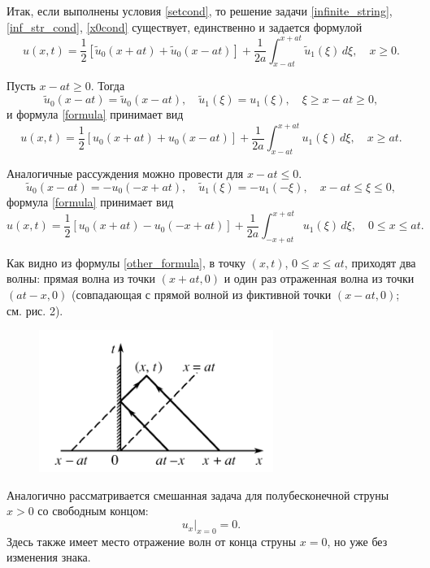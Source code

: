 Итак, если выполнены условия \eqref{setcond}, то решение задачи \eqref{infinite_string}, \eqref{inf_str_cond}, \eqref{x0cond} существует, единственно и задается формулой 
\begin{equation} \label{formula}
	u(x, t) = \frac{1}{2} [\tilde{u}_0(x + a t) + \tilde{u}_0(x - a t)] + \frac{1}{2 a} \int_{x - a t}^{x + a t} \tilde{u}_1(\xi) \, d\xi, \quad x \geqslant 0.
\end{equation}

Пусть $x - a t \geqslant 0$. Тогда
\begin{equation}
	\tilde{u}_0(x - a t) = \tilde{u}_0(x - a t), \quad \tilde{u}_1(\xi) = u_1(\xi), \quad \xi \geqslant x - a t \geqslant 0,
\end{equation}
и формула \eqref{formula} принимает вид 
\begin{equation}
	u(x, t) = \frac{1}{2} [u_0(x + a t) + u_0(x - a t)] + \frac{1}{2 a} \int_{x - a t}^{x + a t} u_1(\xi) \, d\xi, \quad x \geqslant at.
\end{equation}

Аналогичные рассуждения можно провести для $x - a t \leqslant 0$. 
\begin{equation*}
	\tilde{u}_0(x - a t) = - u_0(-x + a t), \quad \tilde{u}_1(\xi) = -u_1(-\xi), \quad x - a t \leqslant \xi \leqslant 0,
\end{equation*}
формула \eqref{formula} принимает вид
\begin{equation} \label{other_formula}
	u(x, t) = \frac{1}{2} [u_0(x + a t) - u_0(-x + a t)] + \frac{1}{2a} \int_{-x + a t}^{x + a t} u_1(\xi) \,d\xi, \quad 0 \leqslant x \leqslant a t.
\end{equation}

Как видно из формулы \eqref{other_formula}, в точку $(x, t)$, $0 \leqslant x \leqslant a t$, приходят два волны: прямая волна из точки $(x + a t, 0)$ и один раз отраженная волна из точки $(a t - x, 0)$ (совпадающая с прямой волной из фиктивной точки $(x - at, 0)$; см. рис. 2).

\begin{figure}[H]
	\centering
	\includegraphics[width=0.4\linewidth]{img/mirror3}
	\caption{}
\end{figure}

Аналогично рассматривается смешанная задача для полубесконечной струны $x > 0$ со свободным концом:
\begin{equation*}
	u_x|_{x = 0} = 0.
\end{equation*}
Здесь также имеет место отражение волн от конца струны $x = 0$, но уже без изменения знака. 
